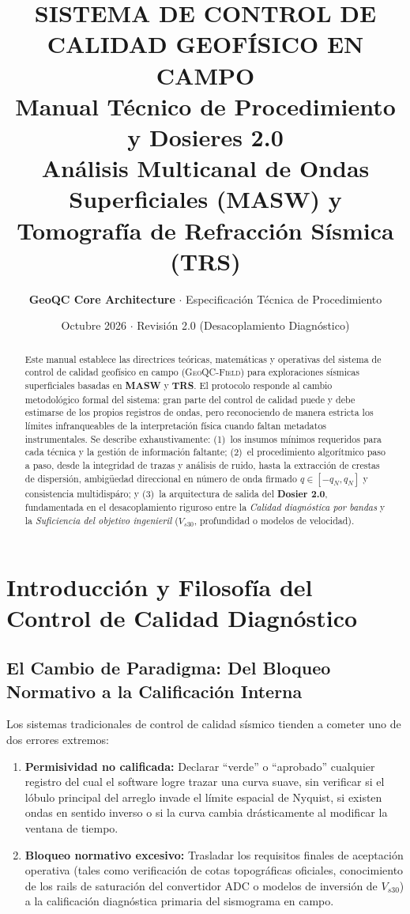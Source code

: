 \documentclass[11pt,a4paper]{article}
\title{
    \vspace{-1.5cm}
    \textbf{\Large SISTEMA DE CONTROL DE CALIDAD GEOFÍSICO EN CAMPO} \\[0.3cm]
    \textbf{\LARGE Manual Técnico de Procedimiento y Dosieres 2.0} \\[0.3cm]
    \large Análisis Multicanal de Ondas Superficiales (MASW) y Tomografía de Refracción Sísmica (TRS)
}
\author{\textbf{GeoQC Core Architecture} $\cdot$ Especificación Técnica de Procedimiento}
\date{Octubre 2026 $\cdot$ Revisión 2.0 (Desacoplamiento Diagnóstico)}
\begin{document}
\maketitle
\thispagestyle{empty}

\begin{abstract}
\noindent Este manual establece las directrices teóricas, matemáticas y operativas del sistema de control de calidad geofísico en campo (\textsc{GeoQC-Field}) para exploraciones sísmicas superficiales basadas en \textbf{MASW} y \textbf{TRS}. El protocolo responde al cambio metodológico formal del sistema: gran parte del control de calidad puede y debe estimarse de los propios registros de ondas, pero reconociendo de manera estricta los límites infranqueables de la interpretación física cuando faltan metadatos instrumentales. Se describe exhaustivamente: (1)~los insumos mínimos requeridos para cada técnica y la gestión de información faltante; (2)~el procedimiento algorítmico paso a paso, desde la integridad de trazas y análisis de ruido, hasta la extracción de crestas de dispersión, ambigüedad direccional en número de onda firmado $q \in [-q_N, q_N]$ y consistencia multidispáro; y (3)~la arquitectura de salida del \textbf{Dosier 2.0}, fundamentada en el desacoplamiento riguroso entre la \emph{Calidad diagnóstica por bandas} y la \emph{Suficiencia del objetivo ingenieril} ($V_{s30}$, profundidad o modelos de velocidad).
\end{abstract}

\vspace{0.3cm}
\tableofcontents
\newpage

\section{Introducción y Filosofía del Control de Calidad Diagnóstico}

\subsection{El Cambio de Paradigma: Del Bloqueo Normativo a la Calificación Interna}
Los sistemas tradicionales de control de calidad sísmico tienden a cometer uno de dos errores extremos:
\begin{enumerate}
    \item \textbf{Permisividad no calificada:} Declarar ``verde'' o ``aprobado'' cualquier registro del cual el software logre trazar una curva suave, sin verificar si el lóbulo principal del arreglo invade el límite espacial de Nyquist, si existen ondas en sentido inverso o si la curva cambia drásticamente al modificar la ventana de tiempo.
    \item \textbf{Bloqueo normativo excesivo:} Trasladar los requisitos finales de aceptación operativa (tales como verificación de cotas topográficas oficiales, conocimiento de los rails de saturación del convertidor ADC o modelos de inversión de $V_{s30}$) a la calificación diagnóstica primaria del sismograma en campo.
\end{enumerate}
\end{document}
